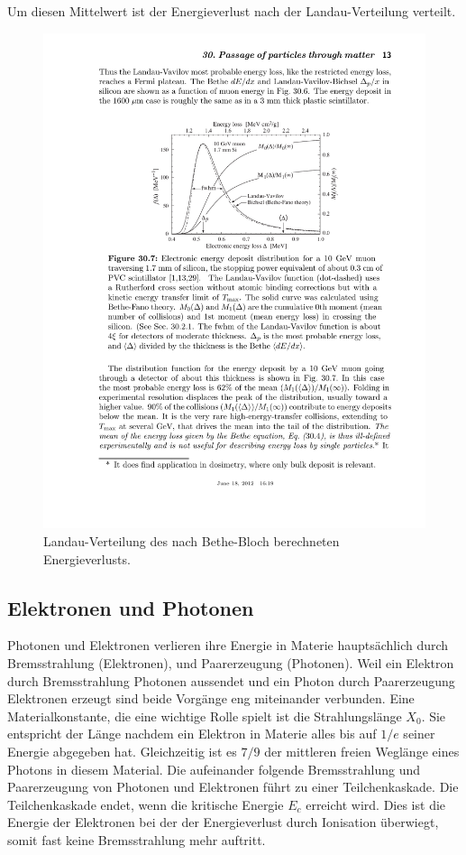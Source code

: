 Um diesen Mittelwert ist der Energieverlust nach der Landau-Verteilung verteilt.
\begin{figure}
\centering
\includegraphics[]{./input/landau.pdf}\caption{Landau-Verteilung des nach Bethe-Bloch berechneten Energieverlusts.\cite{Passage_through_matter}}\label{fig:landau}
\end{figure}
\subsection{Elektronen und Photonen}\label{sec:emschauer}
Photonen und Elektronen verlieren ihre Energie in Materie hauptsächlich durch Bremsstrahlung (Elektronen), und Paarerzeugung (Photonen). Weil ein Elektron durch Bremsstrahlung Photonen aussendet und ein Photon durch Paarerzeugung Elektronen erzeugt sind beide Vorgänge eng miteinander verbunden. Eine Materialkonstante, die eine wichtige Rolle spielt ist die Strahlungslänge $X_0$. Sie entspricht der Länge nachdem ein Elektron in Materie alles bis auf $1/e$ seiner Energie abgegeben hat. Gleichzeitig ist es $7/9$ der mittleren freien Weglänge eines Photons in diesem Material. Die aufeinander folgende Bremsstrahlung und Paarerzeugung von Photonen und Elektronen führt zu einer Teilchenkaskade. Die Teilchenkaskade endet, wenn die kritische Energie $E_c$ erreicht wird. Dies ist die Energie der Elektronen bei der der Energieverlust durch Ionisation überwiegt, somit fast keine Bremsstrahlung mehr auftritt.

